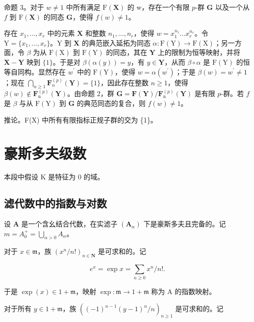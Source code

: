 命题 3。对于 \(w \neq 1\) 中所有满足 \(\mathrm{F}(\mathbf{X})\) 的 w，存在一个有限 \(p\)-群 \(\mathbf{G}\) 以及一个从 \(f\) 到 \(\mathrm{F}(\mathbf{X})\) 的同态 \(\mathbf{G}\)，使得 \(f(w) \neq 1\)。

存在 \(x_{1},\ldots ,x_{r}\) 中的元素 \(\mathbf{X}\) 和整数 \(n_1,\dots ,n_r\)，使得 \(w = x_1^{n_1}\dots x_r^{n_r}\)。令 \(\mathrm{Y} = \{x_1,\dots,x_r\}\)。\(\mathrm{Y}\) 到 \(\mathbf{X}\) 的典范嵌入延拓为同态 \(\alpha : \mathrm{F}(\mathrm{Y})\to \mathrm{F}(\mathrm{X})\)；另一方面，令 \(\beta\) 为从 \(\mathrm{F}(\mathrm{X})\) 到 \(\mathrm{F}(\mathrm{Y})\) 的同态，其在 \(\mathbf{Y}\) 上的限制为恒等映射，并将 \(\mathbf{X} - \mathbf{Y}\) 映到 \(\{1\}\)。于是对 \(\beta (\alpha (y)) = y\)，有 \(y\in \mathbf{Y}\)，从而 \(\beta \circ \alpha\) 是 \(\mathrm{F}(\mathrm{Y})\) 的恒等自同构。显然存在 \(w^{\prime}\) 中的 \(\mathrm{F}(\mathrm{Y})\)，使得 \(w = \alpha (w^{\prime})\)；于是 \(\beta (w) = w^{\prime}\neq 1\)；现在 \(\bigcap_{n\geqslant 1}\mathbf{F}_n^{(p)}(\mathbf{Y}) = \{1\}\)，因此存在整数 \(n\geqslant 1\)，使得 \(\beta (w)\notin \mathbf{F}_{\mathrm{n}}^{(p)}(\mathbf{Y})\)。由命题 2，群 \(\mathbf{G} = \mathbf{F}(\mathbf{Y}) / \mathbf{F}_{\mathrm{n}}^{(p)}(\mathbf{Y})\) 是有限 \(p\)-群。若 \(f\) 是 \(\beta\) 与从 \(\mathrm{F}(\mathrm{Y})\) 到 \(\mathbf{G}\) 的典范同态的复合，则 \(f(w)\neq 1\)。

推论。F(X) 中所有有限指标正规子群的交为 \{1\}。

\section{豪斯多夫级数}

本段中假设 K 是特征为 0 的域。

\subsection{滤代数中的指数与对数}

设 \(\mathbf{A}\) 是一个含幺结合代数，在实滤子 \((\mathbf{A}_{\alpha})\) 下是豪斯多夫且完备的。记 \(m = A_0^+ = \bigcup_{\alpha > 0} A_\alpha\)。

对于 \(x \in \mathfrak{m}\)，族 \((x^n / n!)_{n \in \mathbf{N}}\) 是可求和的。记

\[
e ^ {x} = \exp x = \sum_ {n \geqslant 0} x ^ {n} / n!.\tag{1}
\]

于是 \(\exp (x)\in 1 + \mathfrak{m}\)，映射 \(\exp \colon \mathfrak{m}\to 1 + \mathfrak{m}\) 称为 A 的指数映射。

对于所有 \(y \in 1 + \mathfrak{m}\)，族 \(((-1)^{n-1}(y - 1)^n / n)_{n \geqslant 1}\) 是可求和的。记

